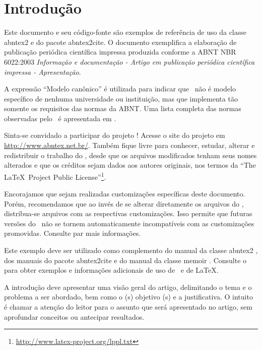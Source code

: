 \documentclass[
article,			%
11pt,				%
twoside,			%
a4paper,			%
section=TITLE,		%
onecolumn,          %
english,			%
brazil,				%
sumario=tradicional
]{abntex2}
\begin{document}
    \section{Introdução}
    
    Este documento e seu código-fonte são exemplos de referência de uso da classe \textsf{abntex2} e do pacote \textsf{abntex2cite}. O documento exemplifica a elaboração de publicação periódica científica impressa produzida conforme a ABNT NBR 6022:2003 \emph{Informação e documentação - Artigo em publicação periódica científica impressa - Apresentação}.
    
    A expressão ``Modelo canônico'' é utilizada para indicar que \abnTeX\ não é modelo específico de nenhuma universidade ou instituição, mas que implementa tão somente os requisitos das normas da ABNT. Uma lista completa das normas observadas pelo \abnTeX\ é apresentada em .
    
    Sinta-se convidado a participar do projeto \abnTeX! Acesse o site do projeto em \url{http://www.abntex.net.br/}. Também fique livre para conhecer, estudar, alterar e redistribuir o trabalho do \abnTeX, desde que os arquivos modificados tenham seus nomes alterados e que os créditos sejam dados aos autores originais, nos termos da ``The \LaTeX\ Project Public License''\footnote{\url{http://www.latex-project.org/lppl.txt}}.
    
    Encorajamos que sejam realizadas customizações específicas deste documento. Porém, recomendamos que ao invés de se alterar diretamente os arquivos do \abnTeX, distribua-se arquivos com as respectivas customizações. Isso permite que futuras versões do \abnTeX~não se tornem automaticamente incompatíveis com as customizações promovidas. Consulte  par mais informações.
    
    Este exemplo deve ser utilizado como complemento do manual da classe \textsf{abntex2} \cite{abntex2classe}, dos manuais do pacote \textsf{abntex2cite} \cite{abntex2cite,abntex2cite-alf} e do manual da classe \textsf{memoir} \cite{memoir}. Consulte o  para obter exemplos e informações adicionais de uso de \abnTeX\ e de \LaTeX.

A introdução deve apresentar uma visão geral do artigo, delimitando o tema e o problema a ser abordado, bem como o (s) objetivo (s) e a justificativa. O intuito é chamar a atenção do leitor para o assunto que será apresentado no artigo, sem aprofundar conceitos ou antecipar resultados. 
\end{document}
